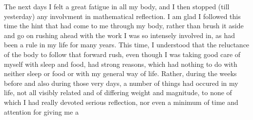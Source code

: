 The next days I felt a great fatigue in all my body,  and I then
stopped (till yesterday) any involvment in mathematical reflection.  I
am glad I followed this time the hint that had come to me through my
body,  rather than brush it aside and go on rushing ahead with the work
I was so intensely involved in,  as had been a rule in my life for 
many years.  This time,  I understood that the reluctance of the body
to follow that forward rush,  even though I was taking good care of
myself with sleep and food,  had strong reasons,  which had nothing to do
with neither sleep or food or with my general way of life.  Rather,
during the weeks before and also during those very days,  a number of
things had occured in my life,  not all visibly related and of differing
weight and magnitude,  to none of which I had really devoted serious
reflection,  nor even a minimum of time and attention  for giving me a


